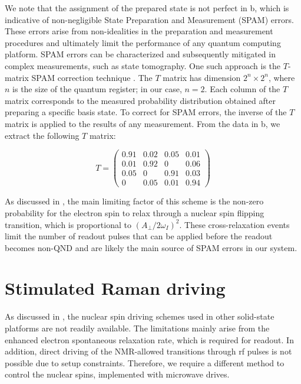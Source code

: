 We note that the assignment of the prepared state is not perfect in b, which is indicative of non-negligible State Preparation and Measurement (SPAM) errors. These errors arise from non-idealities in the preparation and measurement procedures and ultimately limit the performance of any quantum computing platform. SPAM errors can be characterized and subsequently mitigated in complex measurements, such as state tomography. One such approach is the $T$-matrix SPAM correction technique . The $T$ matrix has dimension $2^n \times 2^n$, where $n$ is the size of the quantum register; in our case, $n = 2$. Each column of the $T$ matrix corresponds to the measured probability distribution obtained after preparing a specific basis state. To correct for SPAM errors, the inverse of the $T$ matrix is applied to the results of any measurement. From the data in b, we extract the following $T$ matrix:

\begin{equation}
    T = \begin{pmatrix}
0.91 & 0.02 & 0.05 & 0.01 \\
0.01 & 0.92 & 0 & 0.06 \\
0.05 & 0 & 0.91 & 0.03 \\
0 & 0.05 & 0.01 & 0.94 
\end{pmatrix} 
\end{equation}

As discussed in , the main limiting factor of this scheme is the non-zero probability for the electron spin to relax through a nuclear spin flipping transition, which is proportional to $\left(A_\perp / 2\omega_I \right)^2$. These cross-relaxation events limit the number of readout pulses that can be applied before the readout becomes non-QND and are likely the main source of SPAM errors in our system.

\section{Stimulated Raman driving}

As discussed in , the nuclear spin driving schemes used in other solid-state platforms are not readily available. The limitations mainly arise from the enhanced electron spontaneous relaxation rate, which is required for readout. In addition, direct driving of the NMR-allowed transitions through rf pulses is not possible due to setup constraints. Therefore, we require a different method to control the nuclear spins, implemented with microwave drives.


